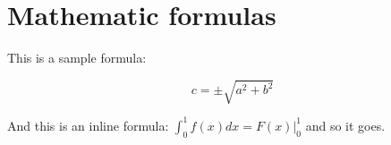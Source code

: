 
\section{Mathematic formulas}
This is a sample formula:

$$ c = \pm\sqrt{a^2 + b^2} $$

And this is an inline formula: $\int_0^1 f(x)dx = F(x)|_0^1$ and
so it goes.

